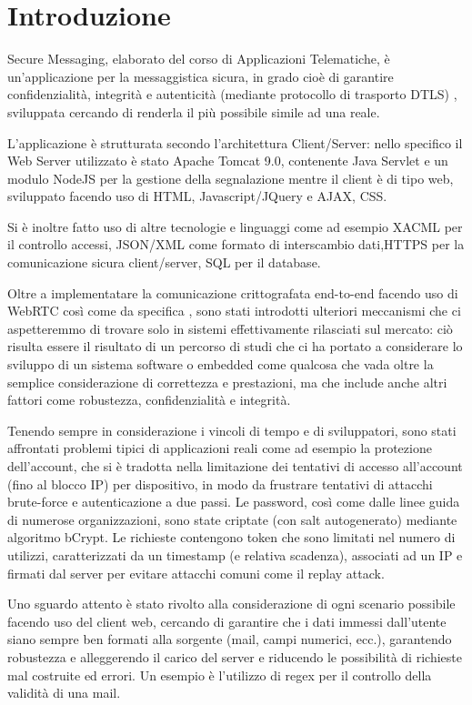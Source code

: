 
\chapter{Introduzione}


 Secure Messaging, elaborato del corso di Applicazioni Telematiche, è un'applicazione per la messaggistica sicura, in grado cioè di garantire confidenzialità, integrità e autenticità (mediante protocollo di trasporto DTLS) , sviluppata cercando di renderla il più possibile simile ad una reale.

L'applicazione è strutturata secondo l'architettura Client/Server: nello specifico il Web Server utilizzato è stato Apache Tomcat 9.0, contenente Java Servlet e un modulo NodeJS per la gestione della segnalazione  mentre il client è di tipo web, sviluppato facendo uso di HTML, Javascript/JQuery e AJAX, CSS.

Si è inoltre fatto uso di altre tecnologie e linguaggi come ad esempio XACML per il controllo accessi, JSON/XML come formato di interscambio dati,HTTPS per la comunicazione sicura client/server, SQL per il database.

Oltre a implementatare la comunicazione crittografata end-to-end facendo uso di WebRTC così come da specifica , sono stati introdotti ulteriori meccanismi che ci aspetteremmo di trovare solo in sistemi effettivamente rilasciati sul mercato: ciò risulta essere il risultato di un percorso di studi che ci ha portato a considerare lo sviluppo di un sistema software o embedded come qualcosa che vada oltre la semplice considerazione di correttezza e prestazioni, ma che include anche altri fattori come robustezza, confidenzialità e integrità.

Tenendo sempre in considerazione i vincoli di tempo e di sviluppatori, sono stati affrontati problemi tipici di applicazioni reali come ad esempio la protezione dell'account, che si è tradotta nella limitazione dei tentativi di accesso all'account (fino al blocco IP) per dispositivo, in modo da frustrare tentativi di attacchi brute-force e autenticazione a due passi. Le password, così come dalle linee guida di numerose organizzazioni, sono state criptate (con salt autogenerato) mediante algoritmo bCrypt. Le richieste contengono token che sono limitati nel numero di utilizzi, caratterizzati da un timestamp (e relativa scadenza), associati ad un IP e firmati dal server per evitare attacchi comuni come il replay attack.

Uno sguardo attento è stato rivolto alla considerazione di ogni scenario possibile facendo uso del client web, cercando di garantire che i dati immessi dall'utente siano sempre ben formati alla sorgente (mail, campi numerici, ecc.), garantendo robustezza e alleggerendo il carico del server e riducendo le possibilità di richieste mal costruite ed errori. Un esempio è l'utilizzo di regex per il controllo della validità di una mail.

\newpage